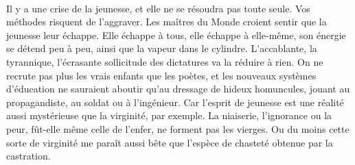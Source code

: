 \documentclass[french,twoside]{book} %
\newcommand{\astertri}{\medskip\par\centerline{\color{rubric}\large\selectfont{\syms ✻\,✻\,✻}}\medskip\par}%
\begin{document}
\astertri

\noindent  \par
Il y a une crise de la jeunesse, et elle ne se résoudra pas toute seule. Vos méthodes risquent de l’aggraver. Les maîtres du Monde croient sentir que la jeunesse leur échappe. Elle échappe à tous, elle échappe à elle-même, son énergie se détend peu à peu, ainsi que la vapeur dans le cylindre. L’accablante, la tyrannique, l’écrasante sollicitude des dictatures va la réduire à rien. On ne recrute pas plus les vrais enfants que les poètes, et les nouveaux systèmes d’éducation ne sauraient aboutir qu’au dressage de hideux homuncules, jouant au propagandiste, au soldat ou à l’ingénieur. Car l’esprit de jeunesse est une réalité aussi mystérieuse que la virginité, par exemple. La niaiserie, l’ignorance ou la peur, fût-elle même celle de l’enfer, ne forment pas les vierges. Ou du moins cette sorte de virginité me paraît aussi bête que l’espèce de chasteté obtenue par la castration.\par
 \par

\astertri
\end{document}
